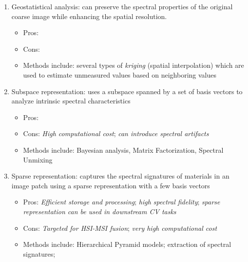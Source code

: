 \begin{itemize}
\begin{itemize}
\begin{itemize}
\begin{enumerate}
\begin{itemize}
                                \end{itemize}
                            \item Geostatistical analysis: can preserve the spectral properties of the original coarse image while enhancing the spatial resolution.
                                \begin{itemize}
                                    \item Pros: 
                                    \item Cons: 
                                    \item Methods include: several types of \textit{kriging} (spatial interpolation) which are used to estimate unmeasured values based on neighboring values
                                \end{itemize}
                            \item Subspace representation: uses a subspace spanned by a set of basis vectors to analyze intrinsic spectral characteristics
                                \begin{itemize}
                                    \item Pros: 
                                    \item Cons: \textit{High computational cost}; \textit{can introduce spectral artifacts}
                                    \item Methods include: Bayesian analysis, Matrix Factorization, Spectral Unmixing
                                \end{itemize}
                            \item Sparse representation: captures the spectral signatures of materials in an image patch using a sparse representation with a few basis vectors
                                \begin{itemize}
                                    \item Pros: \textit{Efficient storage and processing}; \textit{high spectral fidelity}; \textit{sparse representation can be used in downstream CV tasks}
                                    \item Cons: \textit{Targeted for HSI-MSI fusion}; \textit{very high computational cost}
                                    \item Methods include: Hierarchical Pyramid models; extraction of spectral signatures; 
                                \end{itemize}

\end{enumerate}
\end{itemize}
\end{itemize}
\end{itemize}
